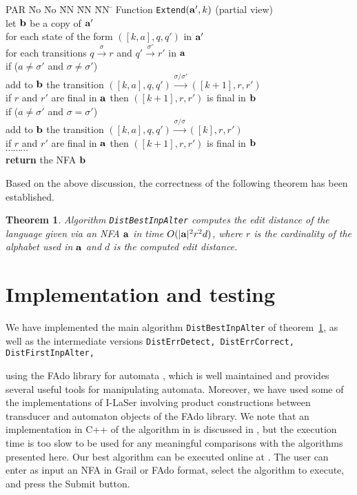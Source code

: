 \documentclass{article}
\theoremstyle{plain}
\newtheorem{theorem}{Theorem}[]
\theoremstyle{definition}
\theoremstyle{remark}
\newcommand{\xra}[1]{\xrightarrow{#1}}
\newcommand\pssn{\par\smallskip\noindent}
\begin{document}
\begin{tabbing}
PAR \= No \= No \= NN \= NN \=NN \=\kill
\> Function \texttt{Extend}$(\mathbf{a}',k)$ (partial view)\\
\> let $\mathbf{b} $ be a copy of $\mathbf{a}'$ \\
\> for each state of the form $([k,a],q,q')$ in $\mathbf{a}'$ \\
\> \> for each transitions $q\xra{\sigma}r$ and $q'\xra{\sigma'}r'$ in $\mathbf{a}$ \\
\>\>\> if ($a\not=\sigma'$ and $\sigma\not=\sigma'$)\\
\>\>\>\> add to $\mathbf{b} $ the transition $([k,a],q,q')\xra{\sigma/\sigma'}([k+1],r,r')$\\
\>\>\>\> if $r$ and $r'$ are final in $\mathbf{a}$ then
$([k+1],r,r')$ is final in $\mathbf{b} $\\
\>\>\> if ($a\not=\sigma'$ and $\sigma=\sigma'$)\\
\>\>\>\> add to $\mathbf{b} $ the transition $([k,a],q,q')\xra{\sigma/\sigma}([k],r,r')$\\
\>\>\>\> if $r$ and $r'$ are final in $\mathbf{a}$ then
$([k+1],r,r')$ is final in $\mathbf{b} $\\
\>\>\> $\cdots\cdots\cdots$\\
\> \textbf{return} the NFA $\mathbf{b} $
\end{tabbing}
Based on the above discussion, the correctness of the following theorem has been established.
\begin{theorem}\label{th:final}
Algorithm \texttt{DistBestInpAlter} computes the
edit distance of the language given via an NFA $\mathbf{a}$ in
time $O(|\mathbf{a}|^2r^2d)$, where $r$ is the cardinality
of the alphabet used in $\mathbf{a}$ and $d$ is the
computed edit distance.
\end{theorem}



\section{Implementation and testing}\label{sec:implem}
We have implemented the main algorithm \texttt{DistBestInpAlter} of theorem~\ref{th:final}, as well as the intermediate versions
\pssi
\texttt{DistErrDetect, DistErrCorrect, DistFirstInpAlter,}
\pssn
using the FAdo library for automata
\cite{Fado}, which is well maintained and provides
several useful tools for manipulating automata.
Moreover, we have used some of the implementations
of I-LaSer \cite{ilaser} involving product constructions
between transducer and automaton objects of the FAdo
library. We note that an implementation in C++ of the
algorithm in \cite{Kon:2007} is discussed in
\cite{Daka:2011}, but the execution time is too slow
to be used for any meaningful comparisons with the algorithms
presented here. Our best algorithm can be executed online
at \cite{olaser}. The user can enter as input
an NFA in Grail or FAdo format, select the algorithm to execute,
and press the Submit button.
\end{document}
